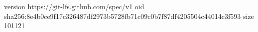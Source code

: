 version https://git-lfs.github.com/spec/v1
oid sha256:8e4b0ce9f17c326487df2973b5728fb71c09c0b7f87df4205504c44014c3f593
size 101121
